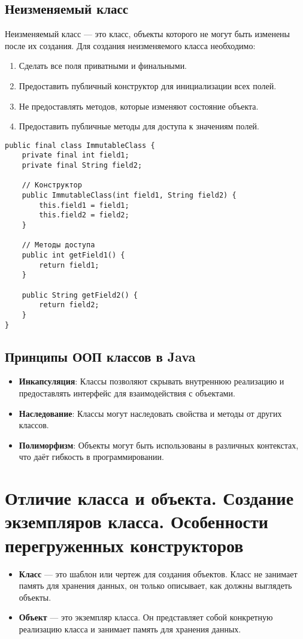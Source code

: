 \documentclass[12pt, a4paper]{article}
\begin{document}
\subsection*{Неизменяемый класс}
Неизменяемый класс — это класс, объекты которого не могут быть изменены после их создания. Для создания неизменяемого класса необходимо:
\begin{enumerate}
    \item Сделать все поля приватными и финальными.
    \item Предоставить публичный конструктор для инициализации всех полей.
    \item Не предоставлять методов, которые изменяют состояние объекта.
    \item Предоставить публичные методы для доступа к значениям полей.
\end{enumerate}

\begin{verbatim}
public final class ImmutableClass {
    private final int field1;
    private final String field2;

    // Конструктор
    public ImmutableClass(int field1, String field2) {
        this.field1 = field1;
        this.field2 = field2;
    }

    // Методы доступа
    public int getField1() {
        return field1;
    }

    public String getField2() {
        return field2;
    }
}
\end{verbatim}

\subsection*{Принципы ООП классов в Java}
\begin{itemize}
    \item \textbf{Инкапсуляция}: Классы позволяют скрывать внутреннюю реализацию и предоставлять интерфейс для взаимодействия с объектами.
    \item \textbf{Наследование}: Классы могут наследовать свойства и методы от других классов.
    \item \textbf{Полиморфизм}: Объекты могут быть использованы в различных контекстах, что даёт гибкость в программировании.
\end{itemize}


\section{Отличие класса и объекта. Создание экземпляров класса. Особенности перегруженных конструкторов}
\begin{itemize}
    \item \textbf{Класс} — это шаблон или чертеж для создания объектов. Класс не занимает память для хранения данных, он только описывает, как должны выглядеть объекты.
    \item \textbf{Объект} — это экземпляр класса. Он представляет собой конкретную реализацию класса и занимает память для хранения данных.
\end{itemize}
\end{document}
